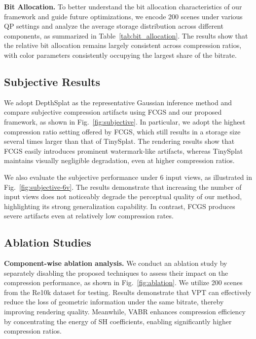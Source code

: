 \documentclass[lettersize,journal]{IEEEtran}
\begin{document}
\textbf{Bit Allocation.}
To better understand the bit allocation characteristics of our framework and guide future optimizations, we encode 200 scenes under various QP settings and analyze the average storage distribution across different components, as summarized in Table~\ref{tab:bit_allocation}. The results show that the relative bit allocation remains largely consistent across compression ratios, with color parameters consistently occupying the largest share of the bitrate.


\subsection{Subjective Results}
We adopt DepthSplat as the representative Gaussian inference method and compare subjective compression artifacts using FCGS and our proposed framework, as shown in Fig.~\ref{fig:subjective}.
In particular, we adopt the highest compression ratio setting offered by FCGS, which still results in a storage size several times larger than that of TinySplat.
The rendering results show that FCGS easily introduces prominent watermark-like artifacts, whereas TinySplat maintains visually negligible degradation, even at higher compression ratios.

We also evaluate the subjective performance under 6 input views, as illustrated in Fig.~\ref{fig:subjective-6v}. The results demonstrate that increasing the number of input views does not noticeably degrade the perceptual quality of our method, highlighting its strong generalization capability. In contrast, FCGS produces severe artifacts even at relatively low compression rates.

\subsection{Ablation Studies}
\textbf{Component-wise ablation analysis.} We conduct an ablation study by separately disabling the proposed techniques to assess their impact on the compression performance, as shown in Fig.~\ref{fig:ablation}. We utilize 200 scenes from the Re10k dataset for testing. Results demonstrate that VPT can effectively reduce the loss of geometric information under the same bitrate, thereby improving rendering quality.
Meanwhile, VABR enhances compression efficiency by concentrating the energy of SH coefficients, enabling significantly higher compression ratios.
\end{document}
